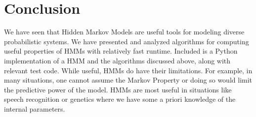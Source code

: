

\section{Conclusion}
We have seen that Hidden Markov Models are useful tools for modeling
diverse probabilistic systems. We have presented and analyzed algorithms
for computing useful properties of HMMs with relatively fast runtime.
Included is a Python implementation of a HMM and the algorithms
discussed above, along with relevant test code. While useful, HMMs do
have their limitations. For example, in many situations, one cannot
assume the Markov Property or doing so would limit the predictive
power of the model. HMMs are most useful in situations like speech
recognition or genetics where we have some a priori knowledge of the
internal parameters.
